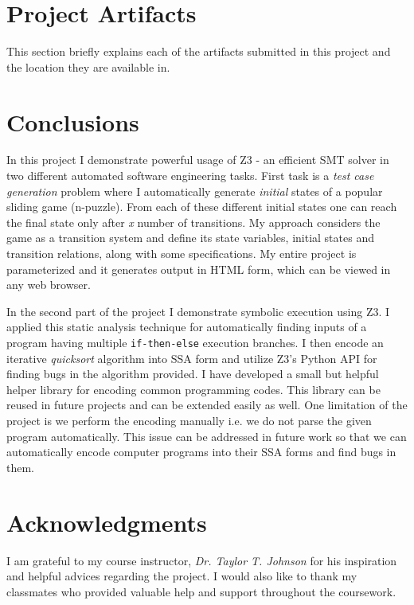 \documentclass{sig-alternate-05-2015}
\begin{document}
\section{Project Artifacts} \label{artifacts}

This section briefly explains each of the artifacts submitted in this project 
and the location they are available in.


\section{Conclusions}

In this project I demonstrate powerful usage of Z3 - an efficient SMT 
solver in two different automated software engineering tasks. First task 
is a \textit{test case generation} problem where I automatically 
generate \textit{initial} states of a popular sliding game (n-puzzle). 
From each of these different initial states one can reach the final state 
only after \textit{x} number of transitions. My approach considers the 
game as a transition system and define its state variables, initial states 
and transition relations, along with some specifications. My entire project 
is parameterized and it generates output in HTML form, which can be viewed 
in any web browser.

In the second part of the project I demonstrate symbolic execution using Z3. 
I applied this static analysis technique for automatically finding inputs of 
a program having multiple \texttt{if-then-else} execution branches. I then encode an 
iterative \textit{quicksort} algorithm into SSA form and utilize Z3's Python 
API for finding bugs in the algorithm provided. I have developed a small 
but helpful helper library for encoding common programming codes. 
This library can be reused in future projects and can be extended easily as 
well. One limitation of the project is we perform the encoding manually i.e. 
we do not parse the given program automatically. This issue can be addressed in 
future work so that we can automatically encode computer programs into their 
SSA forms and find bugs in them.



\section{Acknowledgments}
I am grateful to my course instructor, \textit{Dr. Taylor T. Johnson} for 
his inspiration and helpful advices regarding the project. I would also like to thank my 
classmates who provided valuable help and support throughout the coursework.
\end{document}
